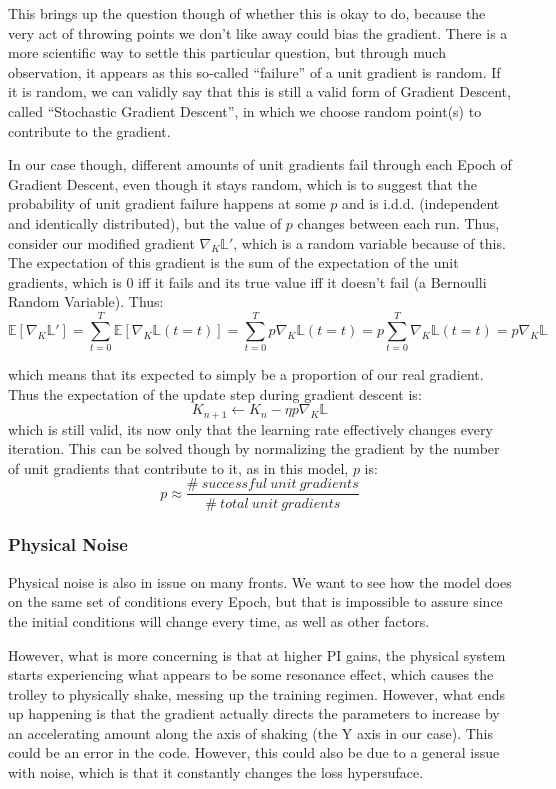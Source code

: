 \documentclass[letterpaper]{article}
\begin{document}
This brings up the question though of whether this is okay to do, because the very act of throwing points we don't like away could bias the gradient. There is a more scientific way to settle this particular question, but through much observation, it appears as this so-called ``failure'' of a unit gradient is random. If it is random, we can validly say that this is still a valid form of Gradient Descent, called ``Stochastic Gradient Descent'', in which we choose random point(s) to contribute to the gradient.

In our case though, different amounts of unit gradients fail through each Epoch of Gradient Descent, even though it stays random, which is to suggest that the probability of unit gradient failure happens at some $p$ and is i.d.d. (independent and identically distributed), but the value of $p$ changes between each run. Thus, consider our modified gradient $\nabla_K\mathbb{L}'$, which is a random variable because of this. The expectation of this gradient is the sum of the expectation of the unit gradients, which is 0 iff it fails and its true value iff it doesn't fail (a Bernoulli Random Variable). Thus:
$$\mathbb{E}[\nabla_K\mathbb{L}']=\sum_{t=0}^{T}{\mathbb{E}[\nabla_K\mathbb{L}(t=t)]}=\sum_{t=0}^{T}{p\nabla_K\mathbb{L}(t=t)}=p\sum_{t=0}^{T}{\nabla_K\mathbb{L}(t=t)}=p\nabla_K\mathbb{L}$$

which means that its expected to simply be a proportion of our real gradient. Thus the expectation of the update step during gradient descent is:
$$K_{n+1} \leftarrow K_{n}-\eta p \nabla_K\mathbb{L}$$
which is still valid, its now only that the learning rate effectively changes every iteration. This can be solved though by normalizing the gradient by the number of unit gradients that contribute to it, as in this model, $p$ is:
$$p \approx \frac{\#\ successful\ unit\ gradients}{\#\ total\ unit\ gradients}$$

\subsubsection{Physical Noise}
Physical noise is also in issue on many fronts. We want to see how the model does on the same set of conditions every Epoch, but that is impossible to assure since the initial conditions will change every time, as well as other factors.

However, what is more concerning is that at higher PI gains, the physical system starts experiencing what appears to be some resonance effect, which causes the trolley to physically shake, messing up the training regimen. However, what ends up happening is that the gradient actually directs the parameters to increase by an accelerating amount along the axis of shaking (the Y axis in our case). This could be an error in the code. However, this could also be due to a general issue with noise, which is that it constantly changes the loss hypersuface.
\end{document}
